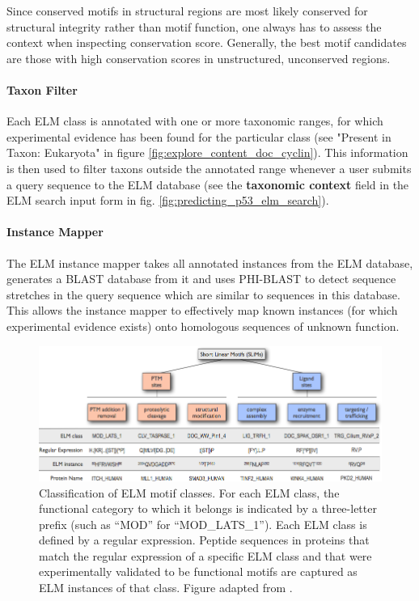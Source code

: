 \documentclass[12pt]{article}
\newcommand\button[1]{%
	\textbf{#1}%
}
\begin{document}
Since conserved motifs in structural regions are most likely conserved for
structural integrity rather than motif function, one always has to assess the
context when inspecting conservation score. Generally, the best motif candidates
are those with high conservation scores in unstructured, unconserved
regions.


\paragraph*{Taxon Filter}\label{TaxonFilter}

Each ELM class is annotated with one or more taxonomic ranges, for which
experimental evidence has been found for the particular class
(see "Present in Taxon: Eukaryota" in figure
\ref{fig:explore_content_doc_cyclin}). This information is then used to filter taxons
outside the annotated range whenever a user submits a query sequence to the ELM
database (see the \button{taxonomic context} field in the ELM search input form in fig.
\ref{fig:predicting_p53_elm_search}).

\paragraph*{Instance Mapper}\label{InstanceMapper}

The ELM instance mapper takes all annotated instances from the ELM database,
generates a BLAST database from it and uses PHI-BLAST \citep{9705509}
to detect sequence stretches in
the query sequence which are similar to sequences in this database. This allows
the instance mapper to effectively map known instances (for which experimental
evidence exists) onto homologous sequences of unknown function.

\begin{figure}[h!]
\centering
\includegraphics[width=\textwidth]{Figures/Introduction/functional_classification_of_SLiMs.png}
\caption{
Classification of ELM motif classes.
For each ELM class, the functional category to which it belongs is indicated by
a three-letter prefix (such as ``MOD'' for ``MOD\_LATS\_1'').
Each ELM class is defined by a regular expression. Peptide sequences in
proteins that match the regular expression of a specific ELM class and that
were experimentally validated to be functional motifs are captured as ELM
instances of that class.
Figure adapted from \cite{24773235}.
}
\label{fig:SLiMclasses}
\end{figure}
\end{document}
